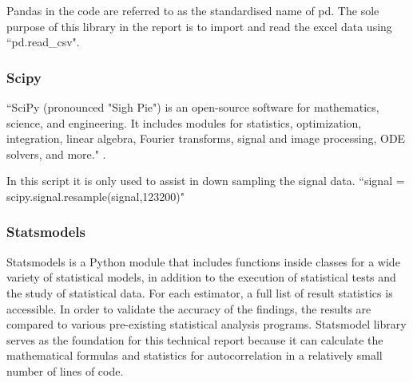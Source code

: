 Pandas in the code are referred to as the standardised name of pd. The sole purpose of this library in the report is to import and read the excel data using ``pd.read\_csv".

\subsubsection{Scipy}

``SciPy (pronounced "Sigh Pie") is an open-source software for mathematics, science, and engineering. It includes modules for statistics, optimization, integration, linear algebra, Fourier transforms, signal and image processing, ODE solvers, and more." \cite{Scipy}.  

In this script it is only used to assist in down sampling the signal data. 
``signal = scipy.signal.resample(signal,123200)" 

\subsubsection{Statsmodels}

Statsmodels is a Python module that includes functions inside classes for a wide variety of statistical models, in addition to the execution of statistical tests and the study of statistical data. For each estimator, a full list of result statistics is accessible. In order to validate the accuracy of the findings, the results are compared to various pre-existing statistical analysis programs. \cite{law2019stumpy} 
Statsmodel library serves as the foundation for this technical report because it can calculate the mathematical formulas and statistics for autocorrelation in a relatively small number of lines of code.

